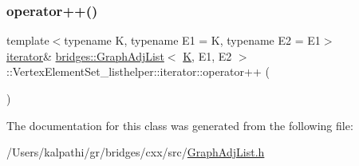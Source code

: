 \mbox{\label{classbridges_1_1_graph_adj_list_1_1_vertex_element_set__listhelper_1_1iterator_ad0d28c10ae2a8a5592ccda4b659fd638}} 
\subsubsection{\texorpdfstring{operator++()}{operator++()}}
{\footnotesize\ttfamily template$<$typename K, typename E1 = K, typename E2 = E1$>$ \\
\mbox{\hyperlink{classbridges_1_1_graph_adj_list_1_1_vertex_element_set__listhelper_1_1iterator}{iterator}}\& \mbox{\hyperlink{classbridges_1_1_graph_adj_list}{bridges\+::\+Graph\+Adj\+List}}$<$ \mbox{\hyperlink{namespacebridges_acfb0a4f7877d8f63de3e6862004c50edaa5f3c6a11b03839d46af9fb43c97c188}{K}}, E1, E2 $>$\+::Vertex\+Element\+Set\+\_\+listhelper\+::iterator\+::operator++ (\begin{DoxyParamCaption}{ }\end{DoxyParamCaption})\hspace{0.3cm}{\ttfamily [inline]}}



The documentation for this class was generated from the following file\+:\begin{DoxyCompactItemize}
\item 
/\+Users/kalpathi/gr/bridges/cxx/src/\mbox{\hyperlink{_graph_adj_list_8h}{Graph\+Adj\+List.\+h}}\end{DoxyCompactItemize}
